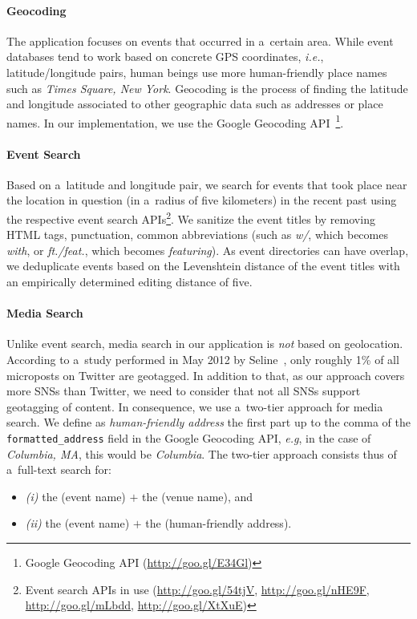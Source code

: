 \documentclass[runningheads,a4paper]{llncs}
\begin{document}
{\paragraph{Geocoding}
The application focuses on events that occurred in a~certain area. While event databases tend to work based on concrete GPS coordinates, \emph{i.e.}, latitude/longitude pairs, human beings use more human-friendly place names such as \emph{Times Square, New York}. Geocoding is the process of finding the latitude and longitude associated to other geographic data such as addresses or place names. In our implementation, we use the Google Geocoding API~\footnote{Google Geocoding API (\url{http://goo.gl/E34Gl})}.

\paragraph{Event Search}
Based on a~latitude and longitude pair, we search for events that took place near the location in question (in a~radius of five kilometers) in the recent past using the respective event search APIs\footnote{Event search APIs in use (\url{http://goo.gl/54tjV}, \url{http://goo.gl/nHE9F}, \url{http://goo.gl/mLbdd}, \url{http://goo.gl/XtXuE})}. We sanitize the event titles by removing HTML tags, punctuation,
common abbreviations (such as \emph{w/}, which becomes \emph{with}, or \emph{ft./feat.}, which becomes \emph{featuring}). As event directories can have overlap, we deduplicate events based on the Levenshtein distance of the event titles with an empirically determined editing distance of five.

\paragraph{Media Search} \label{sec:media-search}
Unlike event search, media search in our application is \emph{not} based on geolocation. According to a~study performed in May 2012 by Seline~\cite{Quora2012},
only roughly 1\% of all microposts on Twitter are geotagged. In addition to that, as our approach covers more SNSs than Twitter, we need to consider that not all SNSs support geotagging of content. In consequence, we use a~two-tier approach for media search. We define as \emph{human-friendly address} the first part up to the comma of the \texttt{formatted\_address} field in the Google Geocoding API, \emph{e.g}, in the case of \emph{Columbia, MA}, this would be \emph{Columbia}. The two-tier approach consists thus of a~full-text search for:
\begin{itemize}
 \item \emph{(i)} the (event name) $+$ the (venue name), and
 \item \emph{(ii)} the (event name) $+$ the (human-friendly address).
\end{itemize}

}
\end{document}
